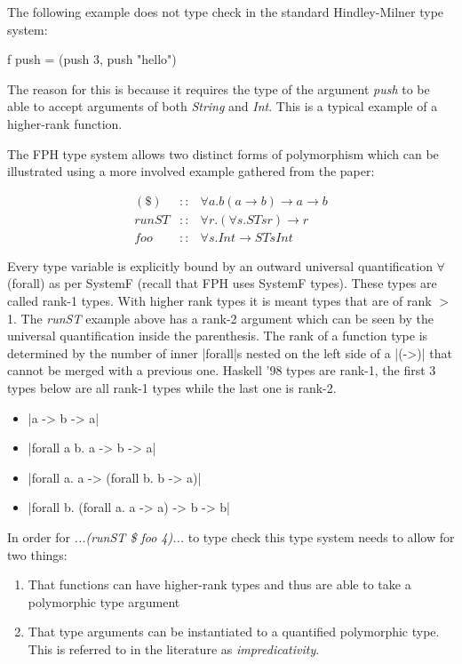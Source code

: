 The following example does not type check in the standard Hindley-Milner type system:
\begin{code}
f push = (push 3, push "hello")
\end{code}

The reason for this is because it requires the type of the argument \textit{push} to be able to accept arguments of both \textit{String} and \textit{Int}. This is a typical example of a higher-rank function. 

The FPH type system allows two distinct forms of polymorphism which can be illustrated using a more involved example gathered from the paper\cite{FPH}:

\begin{eqnarray*}
(\$)  &::& \forall a. b (a\rightarrow b) \rightarrow a \rightarrow b\\
runST &::& \forall r. (\forall s. ST s r) \rightarrow r\\
foo   &::& \forall s. Int \rightarrow ST s Int
\end{eqnarray*}

Every type variable is explicitly bound by an outward universal quantification $\forall$ (forall) as per SystemF (recall that FPH uses SystemF types). These types are called rank-1 types. With higher rank types it is meant types that are of rank $>$ 1.
The \textit{runST} example above has a rank-2 argument which can be seen by the universal quantification inside the parenthesis.
The rank of a function type is determined by the number of inner |forall|s nested on the left side of a |(->)| that cannot be merged with a previous one.
Haskell '98 types are rank-1, the first 3 types below are all rank-1 types while the last one is rank-2.
\begin{itemize}
\item |a -> b -> a|
\item |forall a b. a -> b -> a|
\item |forall a. a -> (forall b. b -> a)|
\item |forall b. (forall a. a -> a) -> b -> b|
\end{itemize}

In order for \textit{...(runST \$ foo 4)...} to type check this type system needs to allow for two things:
\begin{enumerate}
\item That functions can have higher-rank types and thus are able to take a polymorphic type argument
\item That type arguments can be instantiated to a quantified polymorphic type. This is referred to in the literature as \textit{impredicativity}.
\end{enumerate}

